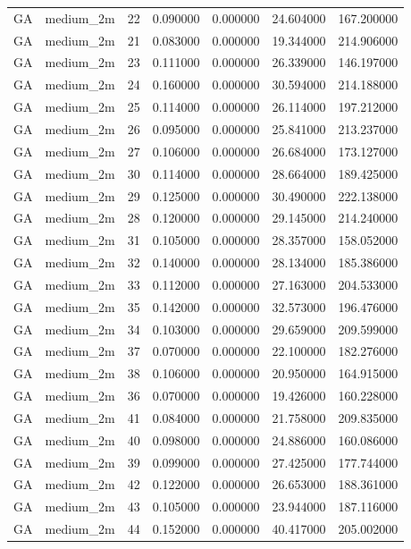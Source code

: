 \begin{tabular}{llrrrrr}
GA & medium_2m & 22 & 0.090000 & 0.000000 & 24.604000 & 167.200000 \\
GA & medium_2m & 21 & 0.083000 & 0.000000 & 19.344000 & 214.906000 \\
GA & medium_2m & 23 & 0.111000 & 0.000000 & 26.339000 & 146.197000 \\
GA & medium_2m & 24 & 0.160000 & 0.000000 & 30.594000 & 214.188000 \\
GA & medium_2m & 25 & 0.114000 & 0.000000 & 26.114000 & 197.212000 \\
GA & medium_2m & 26 & 0.095000 & 0.000000 & 25.841000 & 213.237000 \\
GA & medium_2m & 27 & 0.106000 & 0.000000 & 26.684000 & 173.127000 \\
GA & medium_2m & 30 & 0.114000 & 0.000000 & 28.664000 & 189.425000 \\
GA & medium_2m & 29 & 0.125000 & 0.000000 & 30.490000 & 222.138000 \\
GA & medium_2m & 28 & 0.120000 & 0.000000 & 29.145000 & 214.240000 \\
GA & medium_2m & 31 & 0.105000 & 0.000000 & 28.357000 & 158.052000 \\
GA & medium_2m & 32 & 0.140000 & 0.000000 & 28.134000 & 185.386000 \\
GA & medium_2m & 33 & 0.112000 & 0.000000 & 27.163000 & 204.533000 \\
GA & medium_2m & 35 & 0.142000 & 0.000000 & 32.573000 & 196.476000 \\
GA & medium_2m & 34 & 0.103000 & 0.000000 & 29.659000 & 209.599000 \\
GA & medium_2m & 37 & 0.070000 & 0.000000 & 22.100000 & 182.276000 \\
GA & medium_2m & 38 & 0.106000 & 0.000000 & 20.950000 & 164.915000 \\
GA & medium_2m & 36 & 0.070000 & 0.000000 & 19.426000 & 160.228000 \\
GA & medium_2m & 41 & 0.084000 & 0.000000 & 21.758000 & 209.835000 \\
GA & medium_2m & 40 & 0.098000 & 0.000000 & 24.886000 & 160.086000 \\
GA & medium_2m & 39 & 0.099000 & 0.000000 & 27.425000 & 177.744000 \\
GA & medium_2m & 42 & 0.122000 & 0.000000 & 26.653000 & 188.361000 \\
GA & medium_2m & 43 & 0.105000 & 0.000000 & 23.944000 & 187.116000 \\
GA & medium_2m & 44 & 0.152000 & 0.000000 & 40.417000 & 205.002000 \\

\end{tabular}
